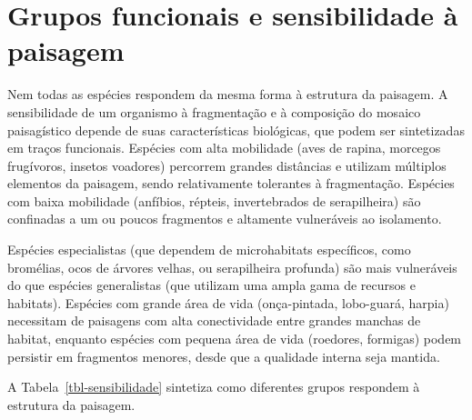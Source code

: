 \documentclass[
  portuguese,
  11pt,
  a4paper,
  open=any]{scrbook}
\begin{document}
\section{Grupos funcionais e sensibilidade à
paisagem}\label{grupos-funcionais-e-sensibilidade-uxe0-paisagem}

Nem todas as espécies respondem da mesma forma à estrutura da paisagem.
A sensibilidade de um organismo à fragmentação e à composição do mosaico
paisagístico depende de suas características biológicas, que podem ser
sintetizadas em traços funcionais. Espécies com alta mobilidade (aves de
rapina, morcegos frugívoros, insetos voadores) percorrem grandes
distâncias e utilizam múltiplos elementos da paisagem, sendo
relativamente tolerantes à fragmentação. Espécies com baixa mobilidade
(anfíbios, répteis, invertebrados de serapilheira) são confinadas a um
ou poucos fragmentos e altamente vulneráveis ao isolamento.

Espécies especialistas (que dependem de microhabitats específicos, como
bromélias, ocos de árvores velhas, ou serapilheira profunda) são mais
vulneráveis do que espécies generalistas (que utilizam uma ampla gama de
recursos e habitats). Espécies com grande área de vida (onça-pintada,
lobo-guará, harpia) necessitam de paisagens com alta conectividade entre
grandes manchas de habitat, enquanto espécies com pequena área de vida
(roedores, formigas) podem persistir em fragmentos menores, desde que a
qualidade interna seja mantida.

A Tabela~\ref{tbl-sensibilidade} sintetiza como diferentes grupos
respondem à estrutura da paisagem.
\end{document}
